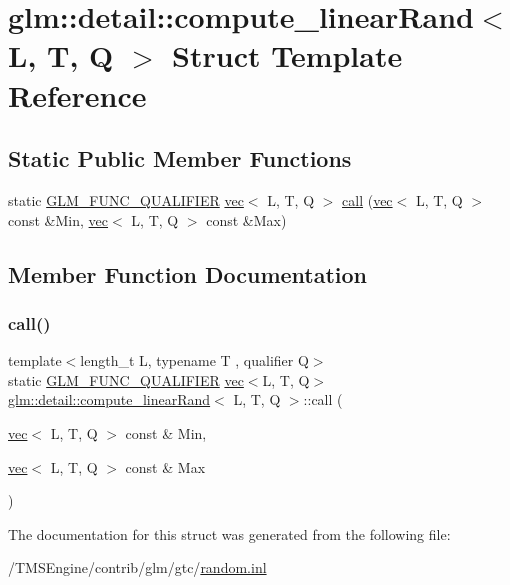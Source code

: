 \hypertarget{structglm_1_1detail_1_1compute__linear_rand}{}\section{glm\+:\+:detail\+:\+:compute\+\_\+linear\+Rand$<$ L, T, Q $>$ Struct Template Reference}
\label{structglm_1_1detail_1_1compute__linear_rand}
\subsection*{Static Public Member Functions}
\begin{DoxyCompactItemize}
\item 
static \hyperlink{setup_8hpp_a33fdea6f91c5f834105f7415e2a64407}{G\+L\+M\+\_\+\+F\+U\+N\+C\+\_\+\+Q\+U\+A\+L\+I\+F\+I\+ER} \hyperlink{structglm_1_1vec}{vec}$<$ L, T, Q $>$ \hyperlink{structglm_1_1detail_1_1compute__linear_rand_a96fb666d7c6fc741f77a6c119d8367d1}{call} (\hyperlink{structglm_1_1vec}{vec}$<$ L, T, Q $>$ const \&Min, \hyperlink{structglm_1_1vec}{vec}$<$ L, T, Q $>$ const \&Max)
\end{DoxyCompactItemize}


\subsection{Member Function Documentation}
\mbox{\label{structglm_1_1detail_1_1compute__linear_rand_a96fb666d7c6fc741f77a6c119d8367d1}} 
\subsubsection{\texorpdfstring{call()}{call()}}
{\footnotesize\ttfamily template$<$length\+\_\+t L, typename T , qualifier Q$>$ \\
static \hyperlink{setup_8hpp_a33fdea6f91c5f834105f7415e2a64407}{G\+L\+M\+\_\+\+F\+U\+N\+C\+\_\+\+Q\+U\+A\+L\+I\+F\+I\+ER} \hyperlink{structglm_1_1vec}{vec}$<$L, T, Q$>$ \hyperlink{structglm_1_1detail_1_1compute__linear_rand}{glm\+::detail\+::compute\+\_\+linear\+Rand}$<$ L, T, Q $>$\+::call (\begin{DoxyParamCaption}\item[{\hyperlink{structglm_1_1vec}{vec}$<$ L, T, Q $>$ const \&}]{Min,  }\item[{\hyperlink{structglm_1_1vec}{vec}$<$ L, T, Q $>$ const \&}]{Max }\end{DoxyParamCaption})\hspace{0.3cm}{\ttfamily [static]}}



The documentation for this struct was generated from the following file\+:\begin{DoxyCompactItemize}
\item 
/\+T\+M\+S\+Engine/contrib/glm/gtc/\hyperlink{random_8inl}{random.\+inl}\end{DoxyCompactItemize}
